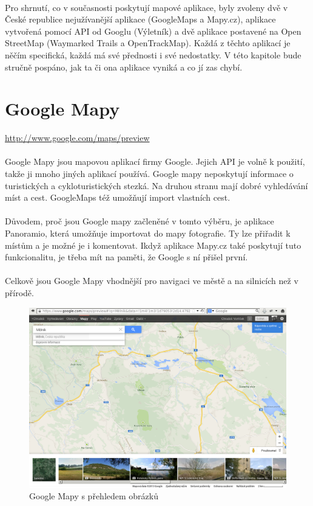 \documentclass[11pt,a4paper,titlepage,oneside]{book}
\begin{document}
	\paragraph{} Pro shrnutí, co v současnosti poskytují mapové aplikace, byly zvoleny dvě v České republice nejužívanější aplikace (GoogleMaps a Mapy.cz), aplikace vytvořená pomocí API od Googlu (Výletník) a dvě aplikace postavené na Open StreetMap (Waymarked Trails a OpenTrackMap). Každá z těchto aplikací je něčím specifická, každá má své přednosti i své nedostatky. V této kapitole bude stručně pospáno, jak ta či ona aplikace vyniká a co jí zas chybí.
	\section{Google Mapy}
		\url{http://www.google.com/maps/preview}
		\paragraph{}Google Mapy jsou mapovou aplikací firmy Google. Jejich API je volně k použití, takže ji mnoho jiných aplikací používá. Google mapy neposkytují informace o turistických a cykloturistických stezká. Na druhou stranu mají dobré vyhledávání míst a cest. GoogleMaps též umožňují import vlastních cest. 
		\paragraph{}Důvodem, proč jsou Google mapy začleněné v tomto výběru, je aplikace Panoramio, která umožňuje importovat do mapy fotografie. Ty lze přiřadit k místům a je možné je i komentovat. Ikdyž aplikace Mapy.cz  také poskytují tuto funkcionalitu, je třeba mít na paměti, že Google s ní přišel první.
		\paragraph{}Celkově jsou Google Mapy vhodnější pro navigaci ve městě a na silnicích než v přírodě.

		\begin{figure}[!h]
			\begin{center}
				\includegraphics[width=12cm]{obrazky/googleMaps.png}
				\caption{Google Mapy s přehledem obrázků}
			\end{center}
		\end{figure}
\end{document}
